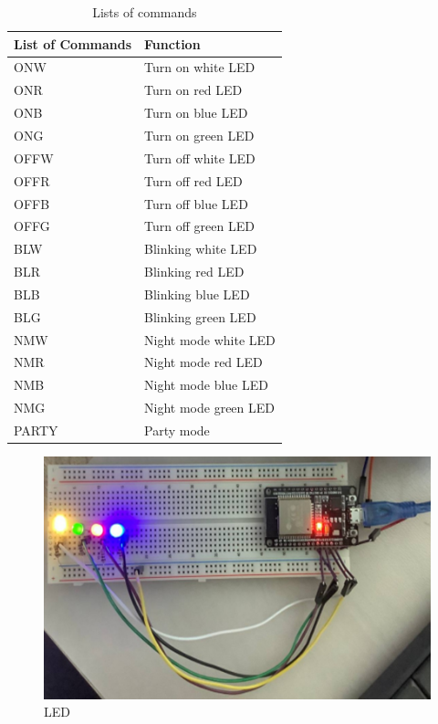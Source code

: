 \begin{table}[]
\begin{center}
\caption{Lists of commands}
\begin{tabular}{|l|l|}
\hline
List of Commands & Function             \\ \hline
ONW              & Turn on white LED    \\ \hline
ONR              & Turn on red LED      \\ \hline
ONB              & Turn on blue LED     \\ \hline
ONG              & Turn on green LED    \\ \hline
OFFW             & Turn off white LED   \\ \hline
OFFR             & Turn off red LED     \\ \hline
OFFB             & Turn off blue LED    \\ \hline
OFFG             & Turn off green LED   \\ \hline
BLW              & Blinking white LED   \\ \hline
BLR              & Blinking red LED     \\ \hline
BLB              & Blinking blue LED    \\ \hline
BLG              & Blinking green LED   \\ \hline
NMW              & Night mode white LED \\ \hline
NMR              & Night mode red LED   \\ \hline
NMB              & Night mode blue LED  \\ \hline
NMG              & Night mode green LED \\ \hline
PARTY            & Party mode           \\ \hline
\end{tabular}
\end{center}
\end{table}


\begin{figure}[htbp]
\centerline{\includegraphics{image7.png}}
\caption{LED}
\label{fig}
\end{figure}




